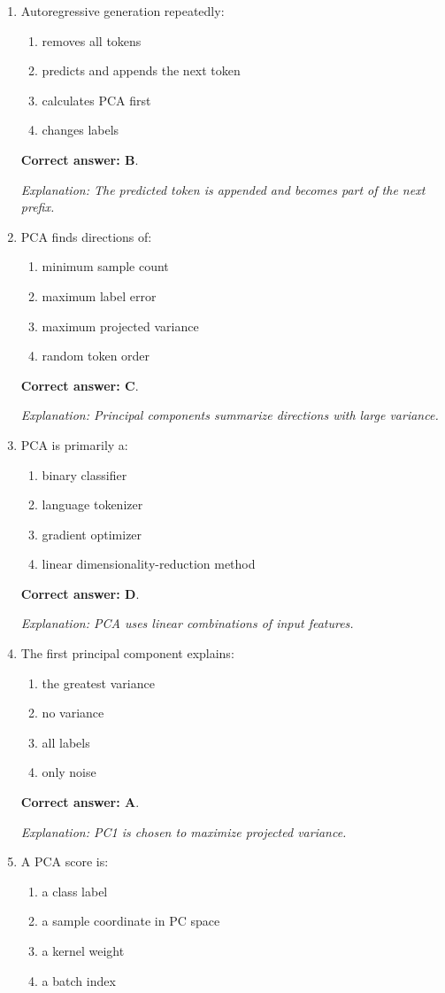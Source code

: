 \documentclass[10pt,a4paper]{article}
\newcommand{\ans}[1]{\par\textbf{Correct answer: #1}}
\newcommand{\expn}[1]{\par\textit{Explanation: #1}}
\begin{document}
\begin{enumerate}[label=\textbf{\arabic*.},itemsep=4pt]
\ans{A}. \expn{Next-token prediction must use only the prefix.}
\item Autoregressive generation repeatedly:
\begin{enumerate}[label=\Alph*.,itemsep=0pt]\item removes all tokens\item predicts and appends the next token\item calculates PCA first\item changes labels\end{enumerate}
\ans{B}. \expn{The predicted token is appended and becomes part of the next prefix.}
\item PCA finds directions of:
\begin{enumerate}[label=\Alph*.,itemsep=0pt]\item minimum sample count\item maximum label error\item maximum projected variance\item random token order\end{enumerate}
\ans{C}. \expn{Principal components summarize directions with large variance.}
\item PCA is primarily a:
\begin{enumerate}[label=\Alph*.,itemsep=0pt]\item binary classifier\item language tokenizer\item gradient optimizer\item linear dimensionality-reduction method\end{enumerate}
\ans{D}. \expn{PCA uses linear combinations of input features.}
\item The first principal component explains:
\begin{enumerate}[label=\Alph*.,itemsep=0pt]\item the greatest variance\item no variance\item all labels\item only noise\end{enumerate}
\ans{A}. \expn{PC1 is chosen to maximize projected variance.}
\item A PCA score is:
\begin{enumerate}[label=\Alph*.,itemsep=0pt]\item a class label\item a sample coordinate in PC space\item a kernel weight\item a batch index\end{enumerate}

\end{enumerate}
\end{document}

